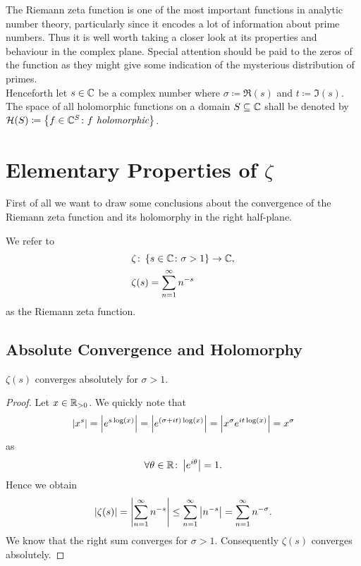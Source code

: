 The Riemann zeta function is one of the most important functions in analytic number theory, particularly since it encodes a lot of information about prime numbers. Thus it is well worth taking a closer look at its properties and behaviour in the complex plane. Special attention should be paid to the zeros of the function as they might give some indication of the mysterious distribution of primes. \\
Henceforth let $s \in \mathbb{C}$ be a complex number where $\sigma \coloneqq \Re(s)$ and $t \coloneqq \Im(s)$. The space of all holomorphic functions on a domain $S \subseteq \mathbb{C}$ shall be denoted by $\mathcal{H}(S) \coloneqq \left\{f \in \mathbb{C} ^S \colon f \textit{ holomorphic}\right\}$.


\section{Elementary Properties of $\zeta$}
First of all we want to draw some conclusions about the convergence of the Riemann zeta function and its holomorphy in the right half-plane.


\begin{definition}
	We refer to
\begin{equation*}
\begin{aligned}	
	&\zeta \colon \left\{s \in \mathbb{C} \colon \sigma > 1\right\} \to \mathbb{C}, \\
	&\zeta(s) = \sum_{n = 1}^{\infty} n^{-s}
\end{aligned}
\end{equation*}
	as the Riemann zeta function.
\end{definition}


\subsection{Absolute Convergence and Holomorphy}


\begin{theorem}
	$\zeta(s)$ converges absolutely for $\sigma > 1$.
\end{theorem}
\begin{proof}
	Let $x \in \mathbb{R}_{>0}$. We quickly note that
\begin{equation*}
	\left|x^s\right|
	= \left|e^{s \log(x)}\right|
	= \left|e^{(\sigma + i t) \log(x)}\right|
	= \left|x^{\sigma} e^{i t \log(x)}\right|
	= x^{\sigma}
\end{equation*}
	as
\begin{equation*}
	\forall \theta \in \mathbb{R} \colon \left|e^{i \theta}\right| = 1.
\end{equation*}
	Hence we obtain
\begin{equation*}
	\left|\zeta(s)\right| = \left|\sum_{n = 1}^{\infty} n^{-s}\right| \leq \sum_{n = 1}^{\infty} \left|n^{-s}\right| = \sum_{n = 1}^{\infty} n^{-\sigma}.
\end{equation*}
	We know that the right sum converges for $\sigma > 1$. Consequently $\zeta(s)$ converges absolutely.
\end{proof}


